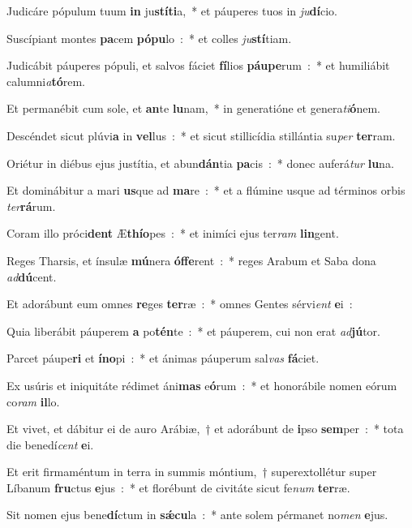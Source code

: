 \item Judicáre pópulum tuum \textbf{in} ju\textbf{stí}\textbf{ti}a,~* et páuperes tuos in \emph{ju}\textbf{dí}cio.
\item Suscípiant montes \textbf{pa}cem \textbf{pó}\textbf{pu}lo~:~* et colles \emph{ju}\textbf{stí}tiam.
\item Judicábit páuperes pópuli, et salvos fáciet \textbf{fí}lios \textbf{páu}\textbf{pe}rum~:~* et humiliábit calumni\emph{a}\textbf{tó}rem.
\item Et permanébit cum sole, et \textbf{an}te \textbf{lu}nam,~* in generatióne et genera\emph{ti}\textbf{ó}nem.
\item Descéndet sicut plúvi\textbf{a} in \textbf{vel}lus~:~* et sicut stillicídia stillántia su\emph{per} \textbf{ter}ram.
\item Oriétur in diébus ejus justítia, et abun\textbf{dán}tia \textbf{pa}cis~:~* donec auferá\emph{tur} \textbf{lu}na.
\item Et dominábitur a mari \textbf{us}que ad \textbf{ma}re~:~* et a flúmine usque ad términos orbis \emph{ter}\textbf{rá}rum.
\item Coram illo próci\textbf{dent} Æ\textbf{thí}\textbf{o}pes~:~* et inimíci ejus ter\emph{ram} \textbf{lin}gent.
\item Reges Tharsis, et ínsulæ \textbf{mú}nera \textbf{óf}\textbf{fe}rent~:~* reges Arabum et Saba dona \emph{ad}\textbf{dú}cent.
\item Et adorábunt eum omnes \textbf{re}ges \textbf{ter}ræ~:~* omnes Gentes sérvi\emph{ent} \textbf{e}i~:
\item Quia liberábit páuperem \textbf{a} po\textbf{tén}te~:~* et páuperem, cui non erat \emph{ad}\textbf{jú}tor.
\item Parcet páupe\textbf{ri} et \textbf{ín}\textbf{o}pi~:~* et ánimas páuperum sal\emph{vas} \textbf{fá}ciet.
\item Ex usúris et iniquitáte rédimet áni\textbf{mas} e\textbf{ó}rum~:~* et honorábile nomen eórum co\emph{ram} \textbf{il}lo.
\item Et vivet, et dábitur ei de auro Arábiæ,~† et adorábunt de \textbf{i}pso \textbf{sem}per~:~* tota die benedí\emph{cent} \textbf{e}i.
\item Et erit firmaméntum in terra in summis móntium,~† superextollétur super Líbanum \textbf{fru}ctus \textbf{e}jus~:~* et florébunt de civitáte sicut fe\emph{num} \textbf{ter}ræ.
\item Sit nomen ejus bene\textbf{dí}ctum in \textbf{sǽ}\textbf{cu}la~:~* ante solem pérmanet no\emph{men} \textbf{e}jus.
